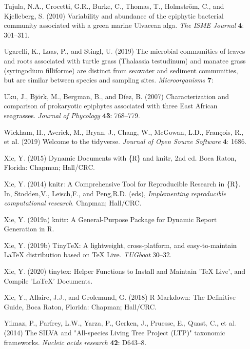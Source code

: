 \documentclass[12pt,]{article}
\begin{document}
\leavevmode\hypertarget{ref-Tujula2010}{}%
Tujula, N.A., Crocetti, G.R., Burke, C., Thomas, T., Holmström, C., and
Kjelleberg, S. (2010) Variability and abundance of the epiphytic
bacterial community associated with a green marine Ulvacean alga.
\emph{The ISME Journal} \textbf{4}: 301--311.

\leavevmode\hypertarget{ref-Ugarelli2019}{}%
Ugarelli, K., Laas, P., and Stingl, U. (2019) The microbial communities
of leaves and roots associated with turtle grass (Thalassia testudinum)
and manatee grass (syringodium filliforme) are distinct from seawater
and sediment communities, but are similar between species and sampling
sites. \emph{Microorganisms} \textbf{7}:

\leavevmode\hypertarget{ref-Uku2007}{}%
Uku, J., Björk, M., Bergman, B., and Díez, B. (2007) Characterization
and comparison of prokaryotic epiphytes associated with three East
African seagrasses. \emph{Journal of Phycology} \textbf{43}: 768--779.

\leavevmode\hypertarget{ref-Wickham2019}{}%
Wickham, H., Averick, M., Bryan, J., Chang, W., McGowan, L.D., François,
R., et al. (2019) Welcome to the tidyverse. \emph{Journal of Open Source
Software} \textbf{4}: 1686.

\leavevmode\hypertarget{ref-Xie2015}{}%
Xie, Y. (2015) Dynamic Documents with \{R\} and knitr, 2nd ed. Boca
Raton, Florida: Chapman; Hall/CRC.

\leavevmode\hypertarget{ref-Xie2014}{}%
Xie, Y. (2014) knitr: A Comprehensive Tool for Reproducible Research in
\{R\}. In, Stodden,V., Leisch,F., and Peng,R.D. (eds),
\emph{Implementing reproducible computational research}. Chapman;
Hall/CRC.

\leavevmode\hypertarget{ref-Xie2019a}{}%
Xie, Y. (2019a) knitr: A General-Purpose Package for Dynamic Report
Generation in R.

\leavevmode\hypertarget{ref-Xie2019}{}%
Xie, Y. (2019b) TinyTeX: A lightweight, cross-platform, and
easy-to-maintain LaTeX distribution based on TeX Live. \emph{TUGboat}
30--32.

\leavevmode\hypertarget{ref-Xie2020}{}%
Xie, Y. (2020) tinytex: Helper Functions to Install and Maintain 'TeX
Live', and Compile 'LaTeX' Documents.

\leavevmode\hypertarget{ref-Xie2018}{}%
Xie, Y., Allaire, J.J., and Grolemund, G. (2018) R Markdown: The
Definitive Guide, Boca Raton, Florida: Chapman; Hall/CRC.

\leavevmode\hypertarget{ref-Yilmaz2014}{}%
Yilmaz, P., Parfrey, L.W., Yarza, P., Gerken, J., Pruesse, E., Quast,
C., et al. (2014) The SILVA and "All-species Living Tree Project (LTP)"
taxonomic frameworks. \emph{Nucleic acids research} \textbf{42}:
D643--8.
\end{document}
